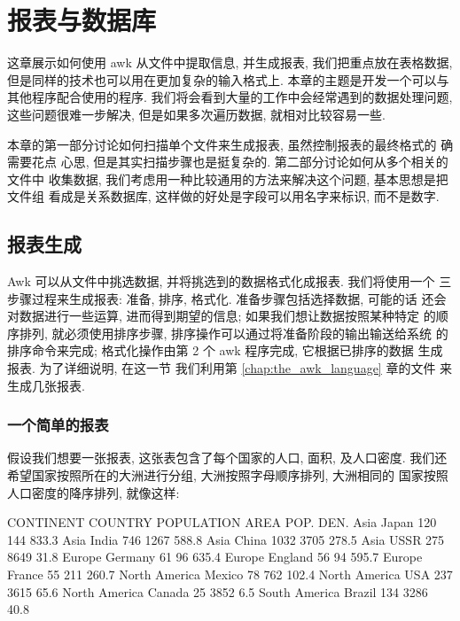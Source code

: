 \chapter{报表与数据库}
\label{chap:reports_and_databases}

这章展示如何使用 awk 从文件中提取信息, 并生成报表, 我们把重点放在表格数据,
但是同样的技术也可以用在更加复杂的输入格式上. 本章的主题是开发一个可以与
其他程序配合使用的程序. 我们将会看到大量的工作中会经常遇到的数据处理问题,
这些问题很难一步解决, 但是如果多次遍历数据, 就相对比较容易一些.

本章的第一部分讨论如何扫描单个文件来生成报表, 虽然控制报表的最终格式的
确需要花点
心思, 但是其实扫描步骤也是挺复杂的. 第二部分讨论如何从多个相关的文件中
收集数据, 我们考虑用一种比较通用的方法来解决这个问题, 基本思想是把文件组
看成是关系数据库, 这样做的好处是字段可以用名字来标识, 而不是数字.

\section{报表生成}
\label{sec:generating_reports}

Awk 可以从文件中挑选数据, 并将挑选到的数据格式化成报表. 我们将使用一个
三步骤过程来生成报表: 准备, 排序, 格式化. 准备步骤包括选择数据, 可能的话
还会对数据进行一些运算, 进而得到期望的信息; 如果我们想让数据按照某种特定
的顺序排列, 就必须使用排序步骤, 排序操作可以通过将准备阶段的输出输送给系统
的排序命令来完成; 格式化操作由第 2 个 awk 程序完成, 它根据已排序的数据
生成报表. 为了详细说明, 在这一节 我们利用第 \ref{chap:the_awk_language} 
章的文件 来生成几张报表.

\subsection{一个简单的报表}
\label{subsec:a_simple_report}

假设我们想要一张报表, 这张表包含了每个国家的人口, 面积, 及人口密度. 
我们还希望国家按照所在的大洲进行分组, 大洲按照字母顺序排列, 大洲相同的
国家按照人口密度的降序排列, 就像这样:
\begin{awkcode}
    CONTINENT       COUNTRY    POPULATION    AREA    POP. DEN.
    Asia            Japan          120        144      833.3
    Asia            India          746       1267      588.8
    Asia            China         1032       3705      278.5
    Asia            USSR           275       8649       31.8
    Europe          Germany         61         96      635.4
    Europe          England         56         94      595.7
    Europe          France          55        211      260.7
    North America   Mexico          78        762      102.4
    North America   USA            237       3615       65.6
    North America   Canada          25       3852        6.5
    South America   Brazil         134       3286       40.8
\end{awkcode}

